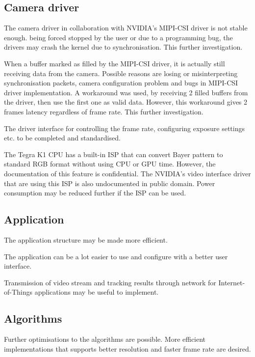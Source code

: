 \subsection{Camera driver}

The camera driver in collaboration with NVIDIA's MIPI-CSI driver is not stable enough.  being forced stopped by the user or due to a programming bug, the drivers may crash the kernel due to  synchronisation. This  further investigation.

When a buffer  marked as filled by the MIPI-CSI driver, it is actually still receiving data from the camera. Possible reasons are losing or misinterpreting synchronisation packets, camera configuration problem and bugs in MIPI-CSI driver implementation. A workaround was used, by receiving 2 filled buffers from the driver, then use the first one as valid data. However, this workaround gives 2 frames latency regardless of frame rate. This  further investigation.

The driver interface for controlling the frame rate, configuring exposure settings etc.  to be completed and standardised.

The Tegra K1 CPU has a built-in ISP that can convert Bayer pattern to standard RGB format without using CPU or GPU time. However, the documentation of this feature is confidential. The NVIDIA's video interface driver that are using this ISP is also undocumented in public domain. Power consumption may be reduced further if the ISP can be used.

\subsection{Application}

The application structure may be made more efficient.

The application can be a lot easier to use and configure with a better user interface.

Transmission of video stream and tracking results through network for Internet-of-Things applications may be useful to implement.

\subsection{Algorithms}

Further optimisations to the algorithms are possible. More efficient implementations that supports better resolution and faster frame rate are desired.

